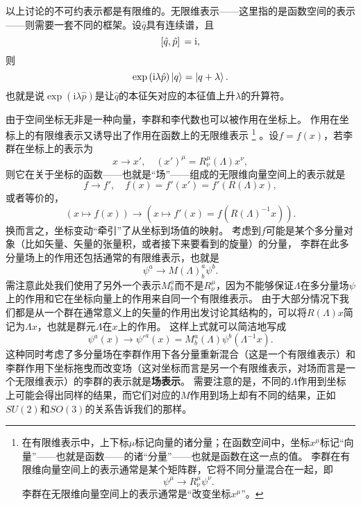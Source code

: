 \documentclass[UTF8, a4paper]{ctexart}
\newcommand*{\ii}{\mathrm{i}}
\begin{document}
以上讨论的不可约表示都是有限维的。无限维表示——这里指的是函数空间的表示——则需要一套不同的框架。设$\hat{q}$具有连续谱，且
\begin{equation}
    \comm*{\hat{q}}{\hat{p}} = \ii,
\end{equation}
则
\begin{equation}
    \exp \left( \ii \lambda \hat{p} \right) \ket{q} = \ket{q + \lambda}.
\end{equation}
也就是说$\exp (\ii \lambda \hat{p})$是让$\hat{q}$的本征矢对应的本征值上升$\lambda$的升算符。

由于空间坐标无非是一种向量，李群和李代数也可以被作用在坐标上。
作用在坐标上的有限维表示又诱导出了作用在函数上的无限维表示%
\footnote{在有限维表示中，上下标$\mu$标记向量的诸分量；在函数空间中，坐标$x^\mu$标记“向量”——也就是函数——的诸“分量”——也就是函数在这一点的值。
李群在有限维向量空间上的表示通常是某个矩阵群，它将不同分量混合在一起，即
\[
    \psi^\mu \longrightarrow R^\mu_\nu \psi^\nu.    
\]
李群在无限维向量空间上的表示通常是“改变坐标$x^\mu$”。
}%
。设$f=f(x)$，若李群在坐标上的表示为
\[
    x \longrightarrow x', \quad (x')^\mu = R_\nu^\mu (\Lambda) x^\nu,
\]
则它在关于坐标的函数——也就是“场”——组成的无限维向量空间上的表示就是
\[
    f \longrightarrow f', \quad f(x) = f'(x') = f'(R(\Lambda) x),
\]
或者等价的，
\begin{equation}
    (x \mapsto f(x)) \longrightarrow (x \mapsto f'(x) = f(R(\Lambda)^{-1} x)).
    \label{eq:infinite-dim-rep}
\end{equation}
换而言之，坐标变动“牵引”了从坐标到场值的映射。
考虑到$f$可能是某个多分量对象（比如矢量、矢量的张量积，或者接下来要看到的旋量）的分量，
李群在此多分量场上的作用还包括通常的有限维表示，也就是
\[
    \psi^a \longrightarrow M(\Lambda)^a_b \psi^b.
\]
需注意此处我们使用了另外一个表示$M^a_b$而不是$R^\mu_\nu$，因为不能够保证$\Lambda$在多分量场$\psi$上的作用和它在坐标向量上的作用来自同一个有限维表示。
由于大部分情况下我们都是从一个群在通常意义上的矢量的作用出发讨论其结构的，可以将$R(\Lambda) x$简记为$\Lambda x$，也就是群元$\Lambda$在$x$上的作用。
这样上式就可以简洁地写成
\begin{equation}
    \psi^a(x) \longrightarrow {\psi'}^a (x) = M^a_b (\Lambda) \psi^b (\Lambda^{-1} x).
    \label{eq:wigner-transform}
\end{equation}
这种同时考虑了多分量场在李群作用下各分量重新混合（这是一个有限维表示）和李群作用下坐标拖曳而改变场（这对坐标而言是另一个有限维表示，对场而言是一个无限维表示）的李群的表示就是\textbf{场表示}。
需要注意的是，不同的$\Lambda$作用到坐标上可能会得出同样的结果，而它们对应的$M$作用到场上却有不同的结果，正如$SU(2)$和$SO(3)$的关系告诉我们的那样。
\end{document}
